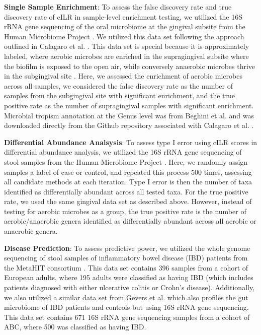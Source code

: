 \documentclass[10pt,letterpaper]{article}
\begin{document}
\noindent \textbf{Single Sample Enrichment}: To assess the false discovery rate and true discovery rate of cILR in sample-level enrichment testing, we utilized the 16S rRNA gene sequencing of the oral microbiome at the gingival subsite from the Human Microbiome Project \cite{consortium2012, proctor2019}. We utilized this data set following the approach outlined in Calagaro et al. \cite{calgaro2020}. This data set is special because it is approximately labeled, where aerobic microbes are enriched in the supragingival subsite where the biofilm is exposed to the open air, while conversely anaerobic microbes thrive in the subgingival site \cite{thurnheer2016}. Here, we assessed the enrichment of aerobic microbes across all samples, we considered the false discovery rate as the number of samples from the subgingival site with significant enrichment, and the true positive rate as the number of supragingival samples with significant enrichment. Microbial tropism annotation at the Genus level was from Beghini et al. \cite{beghini2019} and was downloaded directly from the Github repository associated with Calagaro et al. \cite{matteocalgaro2020}. 

\noindent \textbf{Differential Abundance Analsysis}: To assess type I error using cILR scores in differential abundance analysis, we utilized the 16S rRNA gene sequencing of stool samples from the Human Microbiome Project \cite{consortium2012, proctor2019}. Here, we randomly assign samples a label of case or control, and repeated this process 500 times, assessing all candidate methods at each iteration. Type I error is then the number of taxa identified as differentially abundant across all tested taxa. For the true positive rate, we used the same gingival data set as described above. However, instead of testing for aerobic microbes as a group, the true positive rate is the number of aerobic/anaerobic genera identified as differentially abundant across all aerobic or anaerobic genera. 

\noindent \textbf{Disease Prediction}: To assess predictive power, we utilized the whole genome sequencing of stool samples of inflammatory bowel disease (IBD) patients from the MetaHIT consortium \cite{nielsen2014}. This data set contains 396 samples from a cohort of European adults, where 195 adults were classified as having IBD (which includes patients diagnosed with either ulcerative colitis or Crohn's disease). Additionally, we also utilized a similar data set from Gevers et al. \cite{gevers2014} which also profiles the gut microbiome of IBD patients and controls but using 16S rRNA gene sequencing. This data set contains 671 16S rRNA gene sequencing samples from a cohort of ABC, where 500 was classified as having IBD.
\end{document}
